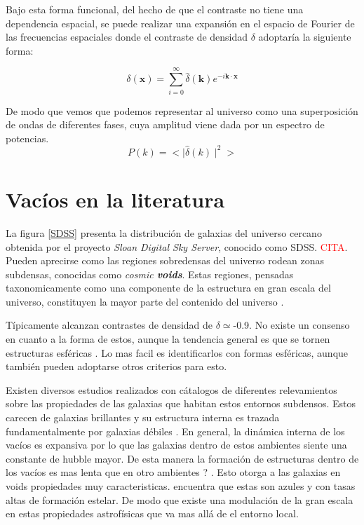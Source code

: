 Bajo esta forma funcional, del hecho de que el contraste no tiene una dependencia espacial, se puede realizar una expansi\'on en el espacio de Fourier de las frecuencias espaciales donde el contraste de densidad $\delta$ adoptar\'ia la siguiente forma:

\begin{equation}
    \delta(\textbf{x})=\sum_{i=0}^{\infty} \hat{\delta}(\textbf{k}) e^{-i\textbf{k}\cdot \textbf{x}}
    \label{seriefourier}
\end{equation}{}

De modo que vemos que podemos representar al universo como una superposici\'on de ondas de diferentes fases, cuya amplitud viene dada por un espectro de potencias.
\begin{equation}
    P(k)=<\mid \hat{\delta}(k) \mid ^{2}>
\end{equation}{}



\section{Vac\'ios en la literatura}

La figura \ref{SDSS} presenta la distribuci\'on de galaxias del universo cercano obtenida por el proyecto \textit{Sloan Digital Sky Server}, conocido como SDSS. \textcolor{red}{CITA}. Pueden aprecirse como las regiones sobredensas del universo rodean zonas subdensas, conocidas como \textit{cosmic \textbf{voids}}. Estas regiones, pensadas taxonomicamente como una componente de la estructura en gran escala del universo, constituyen la mayor parte del contenido del universo \citep{Sheth2004}.

T\'ipicamente alcanzan contrastes de densidad de $\delta\simeq$-0.9. No existe un consenso en cuanto a la forma de estos, aunque la tendencia general es que se tornen estructuras esf\'ericas \citep{Sheth2004}. Lo mas facil es identificarlos con formas esf\'ericas, aunque tambi\'en pueden adoptarse otros criterios para esto. 

Existen diversos estudios realizados con c\'atalogos de diferentes relevamientos sobre las propiedades de las galaxias que habitan estos entornos subdensos. Estos carecen de galaxias brillantes y su estructura interna es trazada fundamentalmente por galaxias d\'ebiles \citep{Alpaslan2014}. En general, la din\'amica interna de los vac\'ios es expansiva \cite{Sheth2004} por lo que las galaxias dentro de estos ambientes siente una constante de hubble mayor. De esta manera la formaci\'on de estructuras dentro de los vac\'ios es mas lenta que en otro ambientes \citep{Kreckel2016} ? \cite{Tomita2000} . Esto otorga a las galaxias en voids propiedades muy caracteristicas. \citep{Ceccarelli2008} encuentra que estas son azules y con tasas altas de formaci\'on estelar. De modo que existe una modulaci\'on de la gran escala en estas propiedades astrof\'isicas que va mas all\'a de el entorno local. 




